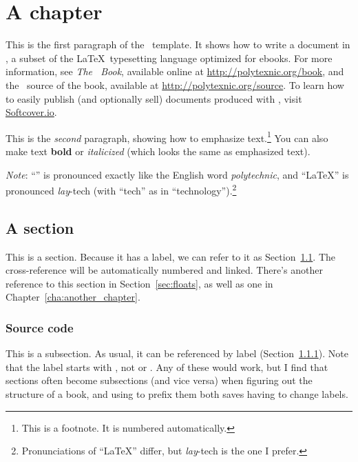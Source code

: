 \chapter{A chapter}
\label{cha:a_chapter}

This is the first paragraph of the \PolyTeXnic\ template. It shows how to write a document in \PolyTeX, a subset of the \LaTeX\ typesetting language optimized for ebooks. For more information, see \emph{The \PolyTeXnic\ Book}, available online at \href{http://polytexnic.org/book}{http://polytexnic.org/book}, and the \PolyTeX\ source of the book, available at \href{http://polytexnic.org/source}{http://polytexnic.org/source}. To learn how to easily publish (and optionally sell) documents produced with \PolyTeXnic, visit \href{http://softcover.io/}{Softcover.io}.

This is the \emph{second} paragraph, showing how to emphasize text.\footnote{This is a footnote. It is numbered automatically.} You can also make text \textbf{bold} or \textit{italicized} (which looks the same as emphasized text).

\emph{Note}: ``\PolyTeXnic'' is pronounced exactly like the English word \emph{polytechnic}, and ``\LaTeX'' is pronounced \emph{lay}-tech (with ``tech'' as in ``technology'').\footnote{Pronunciations of ``\LaTeX'' differ, but \emph{lay}-tech is the one I prefer.}

\section{A section}
\label{sec:a_section}

This is a section. Because it has a label, we can refer to it as Section~\ref{sec:a_section}. The cross-reference will be automatically numbered and linked. There's another reference to this section in Section~\ref{sec:floats}, as well as one in Chapter~\ref{cha:another_chapter}.

\subsection{Source code}
\label{sec:source_code}

This is a subsection. As usual, it can be referenced by label (Section~\ref{sec:source_code}). Note that the label starts with , not  or . Any of these would work, but I find that sections often become subsections (and vice versa) when figuring out the structure of a book, and using  to prefix them both saves having to change labels.

